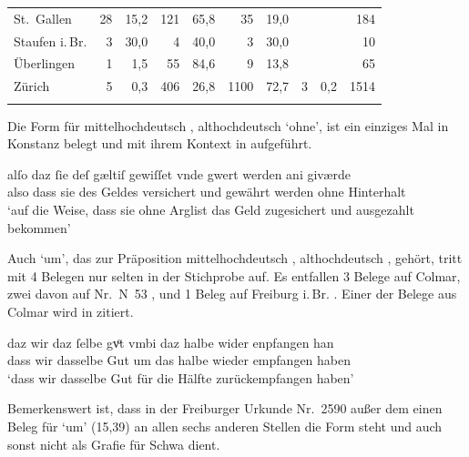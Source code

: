 \begin{table}
\begin{tabular}{
	l @{\qquad}
	r r @{\qquad}
	r r @{\qquad}
	r r @{\qquad}
	r r @{\qquad}
	r}
St.~Gallen
	& 28	& 15,2
	& 121	& 65,8
	& 35	& 19,0
	&		&
	& 184
	\\

Staufen i.\,Br.
	& 3 & 30,0
	& 4	& 40,0
	& 3	& 30,0
	&	&
	& 10
	\\

Überlingen
	& 1		& 1,5	
	& 55	& 84,6
	& 9		& 13,8
	&		&
	& 65
	\\

Zürich
	& 5		& 0,3
	& 406	& 26,8
	& 1100	& 72,7
	& 3		& 0,2
	& 1514
	\\

\lspbottomrule
\end{tabular}
\label{tab:ispelx}
\end{table}

Die Form  für mittelhochdeutsch , althochdeutsch 
`ohne', ist ein einziges Mal in Konstanz belegt und mit ihrem Kontext in
 aufgeführt.

\begin{exe}
\ex\label{ex:konst_ani}
	\gll alſo daz ſie deſ gæltiſ gewiſſet vnde gwert werden ani giværde \\
		also dass sie des Geldes versichert und gewährt werden ohne
			Hinterhalt \\
	\trans `auf die Weise, dass sie ohne Arglist das Geld zugesichert und
		ausgezahlt bekommen'
		\parencites(Nr.~17, Konstanz, 1251)[26,22]{cao1}
\end{exe}

Auch  `um', das zur Präposition mittelhochdeutsch ,
althochdeutsch , gehört, tritt mit 4 Belegen nur selten in der
Stichprobe auf. Es entfallen 3 Belege auf Colmar, zwei davon auf Nr.~N~53
\autocites(Colmar, 1264)[37,2--17]{cao5}, und 1 Beleg auf Freiburg i.\,Br.
\autocites(Nr.~2580, Freiburg i.\,Br., 1297)[9,21--33]{cao4}. Einer der Belege
aus Colmar wird in  zitiert.

\begin{exe}
\ex\label{ex:col_umbi}
	\gll daz wir {daz ſelbe} gvͦt vmbi daz halbe wider enpfangen han \\
		dass wir dasselbe Gut um das halbe wieder empfangen haben \\
	\trans `dass wir dasselbe Gut für die Hälfte  zurückempfangen haben'
		\parencites(Nr.~N~92, Colmar, 1269)[64,27--28]{cao5}
\end{exe}

Bemerkenswert ist, dass in der Freiburger Urkunde Nr.~2590
\autocites(1297)[15,32--16,4]{cao4} außer dem einen Beleg für  `um'
(15,39) an allen sechs anderen Stellen die Form  steht und 
auch sonst nicht als Grafie für Schwa dient.

